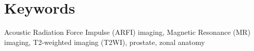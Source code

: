 \section{Keywords}
Acoustic Radiation Force Impulse (ARFI) imaging, Magnetic Resonance (MR)
imaging, T2-weighted imaging (T2WI), prostate, zonal anatomy
